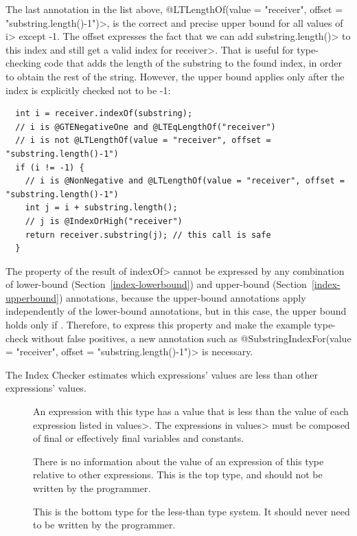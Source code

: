 \noindent
The last annotation in the list above,
\<@LTLengthOf(value = "receiver", offset = "substring.length()-1")>,
is the correct and precise upper bound for all values of \<i> except -1.
The offset expresses the fact that we can add \<substring.length()> to this
index and still get a valid index for \<receiver>.  That is useful for
type-checking code that adds the length of the substring to the found
index, in order to obtain the rest of the string.  However, the upper bound
applies only after the index is explicitly checked not to be -1:

\begin{Verbatim}
  int i = receiver.indexOf(substring);
  // i is @GTENegativeOne and @LTEqLengthOf("receiver")
  // i is not @LTLengthOf(value = "receiver", offset = "substring.length()-1")
  if (i != -1) {
    // i is @NonNegative and @LTLengthOf(value = "receiver", offset = "substring.length()-1")
    int j = i + substring.length();
    // j is @IndexOrHigh("receiver")
    return receiver.substring(j); // this call is safe
  }
\end{Verbatim}

The property of the result of \<indexOf> cannot be expressed by any
combination of lower-bound (Section~\ref{index-lowerbound}) and upper-bound
(Section~\ref{index-upperbound}) annotations, because the upper-bound
annotations apply independently of the lower-bound annotations, but in this
case, the upper bound 
holds only if .  Therefore, to express this property and make
the example type-check without false positives, a new annotation such as
\<@SubstringIndexFor\allowbreak(value = "receiver", offset = "substring.length()-1")>
is necessary.


The Index Checker estimates which expressions' values are less than other expressions' values.

\begin{description}

\item[]
  An expression with this type has a value that is less than the value of each
  expression listed in \<values>. The expressions in \<values> must be composed of
  final or effectively final variables and constants.

\item[]
  There is no information about the value of an expression of this type relative to other expressions.
  This is the top type, and should not be written by the programmer.

 \item[]
   This is the bottom type for the less-than type system. It should
   never need to be written by the programmer.

\end{description}

